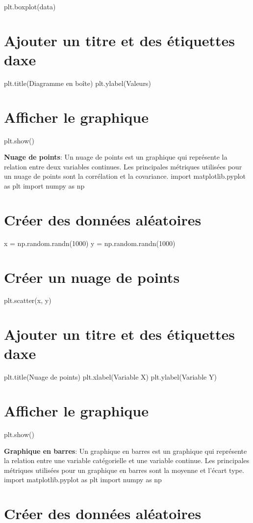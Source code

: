 plt.\+boxplot(data) \section*{Ajouter un titre et des étiquettes d\textquotesingle{}axe}

plt.\+title(\textquotesingle{}Diagramme en boîte\textquotesingle{}) plt.\+ylabel(\textquotesingle{}Valeurs\textquotesingle{}) \section*{Afficher le graphique}

plt.\+show()


\begin{DoxyEnumerate}
\item {\bfseries Nuage de points}\+: Un nuage de points est un graphique qui représente la relation entre deux variables continues. Les principales métriques utilisées pour un nuage de points sont la corrélation et la covariance. import matplotlib.\+pyplot as plt import numpy as np \section*{Créer des données aléatoires}
\end{DoxyEnumerate}

x = np.\+random.\+randn(1000) y = np.\+random.\+randn(1000) \section*{Créer un nuage de points}

plt.\+scatter(x, y)

\section*{Ajouter un titre et des étiquettes d\textquotesingle{}axe}

plt.\+title(\textquotesingle{}Nuage de points\textquotesingle{}) plt.\+xlabel(\textquotesingle{}Variable X\textquotesingle{}) plt.\+ylabel(\textquotesingle{}Variable Y\textquotesingle{}) \section*{Afficher le graphique}

plt.\+show()


\begin{DoxyEnumerate}
\item {\bfseries Graphique en barres}\+: Un graphique en barres est un graphique qui représente la relation entre une variable catégorielle et une variable continue. Les principales métriques utilisées pour un graphique en barres sont la moyenne et l’écart type. import matplotlib.\+pyplot as plt import numpy as np \section*{Créer des données aléatoires}
\end{DoxyEnumerate}

